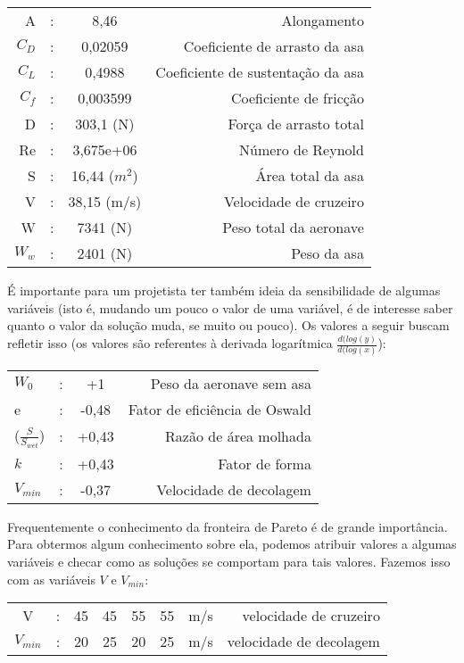\documentclass{article}
\begin{document}
\begin{tabular}{r c c r}
  A & : & 8,46 & Alongamento \\ $C_D$ & : & 0,02059 & Coeficiente de
  arrasto da asa \\ $C_L$ & : & 0,4988 & Coeficiente de sustentação da
  asa \\ $C_f$ & : & 0,003599 & Coeficiente de fricção \\ D & : &
  303,1 (N) & Força de arrasto total \\ Re & : & 3,675e+06 & Número de
  Reynold \\ S & : & 16,44 ($m^2$) & Área total da asa \\ V & : &
  38,15 (m/s) & Velocidade de cruzeiro \\ W & : & 7341 (N) & Peso
  total da aeronave \\ $W_w$ & : & 2401 (N) & Peso da asa \\
\end{tabular}

É importante para um projetista ter também ideia da sensibilidade de
algumas variáveis (isto é, mudando um pouco o valor de uma variável, é
de interesse saber quanto o valor da solução muda, se muito ou
pouco). Os valores a seguir buscam refletir isso (os valores são
referentes à derivada logarítmica $\frac{d(log(y)}{d(log(x)}$):

\begin{tabular}{l c  c  r}
  $W_0$ & : & +1 & Peso da aeronave sem asa \\ e & : & -0,48 & Fator
  de eficiência de Oswald \\ ($\frac{S}{S_{wet}}$) & : & +0,43 & Razão
  de área molhada \\ $k$ & : & +0,43 & Fator de forma \\ $V_{min}$ & : &
  -0,37 & Velocidade de decolagem \\
\end{tabular}


Frequentemente o conhecimento da fronteira de Pareto é de grande
importância. Para obtermos algum conhecimento sobre ela, podemos
atribuir valores a algumas variáveis e checar como as soluções se
comportam para tais valores. Fazemos isso com as variáveis $V$ e
$V_{min}$:

\begin{tabular}{c c c c c c c r}
  V & : & 45 & 45 & 55 & 55 & m/s & velocidade de cruzeiro
  \\ $V_{min}$ & : & 20 & 25 & 20 & 25 & m/s & velocidade de decolagem
\end{tabular}
\end{document}
